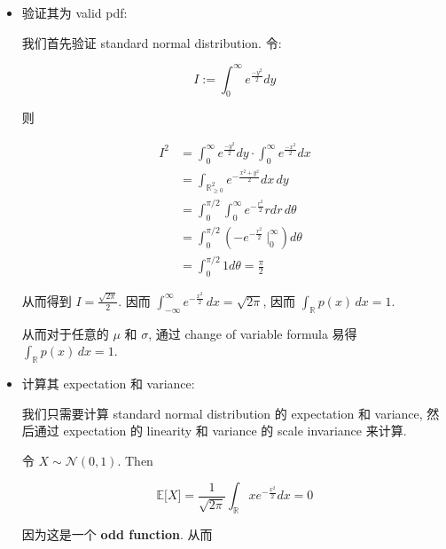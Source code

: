 \begin{itemize}
\item
  验证其为 valid pdf:

  我们首先验证 standard normal distribution. 令:

  \[\mathit{I} := \int_{0}^{\infty}\mathit{e}^{\frac{- \mathit{y}^{2}}{2}}\mathit{d}\mathit{y}\]

  则

  \[\begin{matrix}
  \mathit{I}^{2} & {= \int_{0}^{\infty}\mathit{e}^{\frac{- \mathit{y}^{2}}{2}}\mathit{d}\mathit{y} \cdot \int_{0}^{\infty}\mathit{e}^{\frac{- \mathit{x}^{2}}{2}}\mathit{d}\mathit{x}} \\
   & {= \int_{\mathbb{R}_{\geq 0}^{2}}\mathit{e}^{- \frac{\mathit{x}^{2} + \mathit{y}^{2}}{2}}\mathit{d}\mathit{x}\,\mathit{d}\mathit{y}} \\
   & {= \int_{0}^{\mathit{\pi}/2}\int_{0}^{\infty}\mathit{e}^{- \frac{\mathit{r}^{2}}{2}}\mathit{r}\mathit{d}\mathit{r}\,\mathit{d}\mathit{\theta}} \\
   & {= \int_{0}^{\mathit{\pi}/2}( - \mathit{e}^{- \frac{\mathit{r}^{2}}{2}}\ |_{0}^{\infty})\mathit{d}\mathit{\theta}} \\
   & {= \int_{0}^{\mathit{\pi}/2}1\mathit{d}\mathit{\theta} = \frac{\mathit{\pi}}{2}}
  \end{matrix}\]

  从而得到 \(\mathit{I} = \frac{\sqrt{2\mathit{\pi}}}{2}\). 因而 \(\int_{- \infty}^{\infty}\mathit{e}^{- \frac{\mathit{x}^{2}}{2}}\,\mathit{d}\mathit{x} = \sqrt{2\mathit{\pi}}\), 因而 \(\int_{\mathbb{R}}\mathit{p}(\mathit{x})\,\mathit{d}\mathit{x} = 1\).

  从而对于任意的 \(\mathit{\mu}\) 和 \(\mathit{\sigma}\), 通过 change of variable formula 易得 \(\int_{\mathbb{R}}\mathit{p}(\mathit{x})\,\mathit{d}\mathit{x} = 1\).
\item
  计算其 expectation 和 variance:

  我们只需要计算 standard normal distribution 的 expectation 和 variance, 然后通过 expectation 的 linearity 和 variance 的 scale invariance 来计算.

  令 \(\mathit{X} \sim \mathcal{N}(0,1)\). Then

  \[\mathbb{E}\lbrack\mathit{X}\rbrack = \frac{1}{\sqrt{2\mathit{\pi}}}\int_{\mathbb{R}}\mathit{x}\mathit{e}^{- \frac{\mathit{x}^{2}}{2}}\mathit{d}\mathit{x} = 0\]

  因为这是一个 \textbf{odd function}. 从而


\end{itemize}
